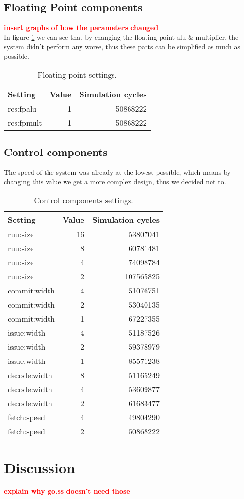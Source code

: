 \documentclass[titlepage, a4paper]{article}
\newcommand{\todo}[1] {\textbf{\textcolor{red}{#1}}}
\begin{document}
\subsection{Floating Point components}
\todo{insert graphs of how the parameters changed} \\
In figure \ref{} we can see that by changing the floating point alu \& multiplier, the system didn't perform any worse, thus these parts can be simplified as much as possible.

\begin{table}[H]
\centering
\caption{Floating point settings.}

\begin{tabular}{|l|r|r|}
  \hline
  \textbf{Setting} & \textbf{Value} & \textbf{Simulation cycles}\\ \hline
  res:fpalu & 1 & 50868222 \\ \hline
  res:fpmult & 1 & 50868222 \\ \hline
\end{tabular}

\label{tab:floatingpoint}
\end{table}

\subsection{Control components}
The speed of the system was already at the lowest possible, which means by changing this value we get a more complex design, thus we decided not to.

\begin{table}[H]
\centering
\caption{Control components settings.}

\begin{tabular}{|l|r|r|}
  \hline
  \textbf{Setting} & \textbf{Value} & \textbf{Simulation cycles}\\ \hline
  ruu:size & 16 & 53807041 \\ \hline
  ruu:size & 8 & 60781481 \\ \hline
  ruu:size & 4 & 74098784 \\ \hline
  ruu:size & 2 & 107565825 \\ \hline
  commit:width & 4 & 51076751 \\ \hline
  commit:width & 2 & 53040135 \\ \hline
  commit:width & 1 & 67227355 \\ \hline
  issue:width & 4 & 51187526 \\ \hline
  issue:width & 2 & 59378979 \\ \hline
  issue:width & 1 & 85571238 \\ \hline
  decode:width & 8 & 51165249 \\ \hline
  decode:width & 4 & 53609877 \\ \hline
  decode:width & 2 & 61683477 \\ \hline
  fetch:speed & 4 & 49804290 \\ \hline
  fetch:speed & 2 & 50868222 \\ \hline
\end{tabular}

\label{tab:floatingpoint}
\end{table}

\section{Discussion}
\todo{explain why go.ss doesn't need those} \\
\end{document}
